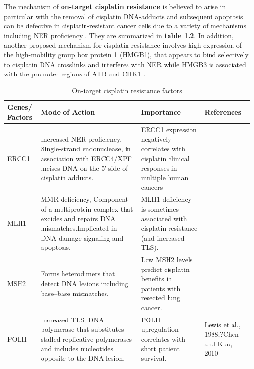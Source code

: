 The mechanism of \textbf{on-target cisplatin resistance} is believed to arise in particular with the removal of cisplatin DNA-adducts and subsequent apoptosis can be defective in cisplatin-resistant cancer cells due to a variety of mechanisms including \ac{NER} proficiency \cite{wood2000dna, shuck2008eukaryotic}. They are summarized in \textbf{table 1.2}. In addition, another proposed mechanism for cisplatin resistance involves high expression of the high-mobility group box protein 1 (HMGB1), that appears to bind selectively to cisplatin DNA crosslinks and interferes with \ac{NER} while HMGB3 is associated with the promoter regions of ATR and CHK1 \cite{awuah2017repair, mukherjee2019targeting}. 




\begin{table}[htbp]
   \centering
   \caption{On-target cisplatin resistance factors}
    \begin{tabular}{p{1.5cm}p{5cm}p{5cm}p{1cm}}
     \hline
      \textbf{Genes/ Factors} & \multicolumn{1}{l}{ \textbf{Mode of Action}} & \multicolumn{1}{p{5cm}}{ \textbf{Importance}} & \multicolumn{1}{p{5cm}}{ \textbf{References}} \\ \hline
ERCC1  & Increased NER proficiency, Single-strand endonuclease, in association with ERCC4/XPF incises DNA on the 5′ side of cisplatin adducts. & ERCC1 expression negatively correlates with  cisplatin clinical responses in multiple human cancers & \multicolumn{1}{p{5cm}}{\cite{dabholkar1992ercc1, metzger1998ercc1, bellmunt2007gene, shirota2001ercc1}} \\
MLH1 & MMR deficiency, Component of a multiprotein complex that excides and repairs DNA mismatches.Implicated in DNA damage signaling and apoptosis. & MLH1 deficiency is sometimes associated with  cisplatin resistance (and increased TLS).  & \multicolumn{1}{p{5cm}}{\cite{nakayama2002copper,nakayama2004prognostic, aida2005expression}} \\
MSH2  & Forms heterodimers that detect DNA lesions including base–base mismatches. & Low MSH2 levels predict  cisplatin benefits in patients with resected lung cancer. & \multicolumn{1}{p{5cm}}{\cite{koike1997canalicular, cui1999drug, yamasaki2011role,korita2010multidrug}} \\
POLH & Increased TLS, DNA polymerase that substitutes stalled replicative polymerases and includes nucleotides opposite to the DNA lesion. & POLH upregulation correlates with short patient survival. & \multicolumn{1}{p{5cm}}{Lewis et al., 1988;?Chen and Kuo, 2010} \\

\end{tabular}
\end{table}
